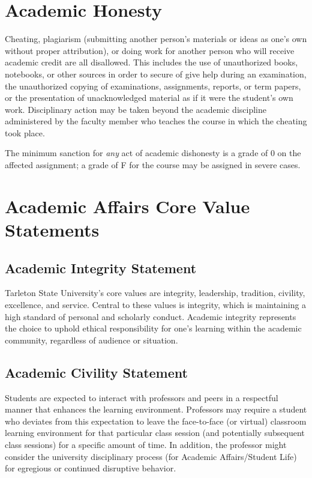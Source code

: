 \documentclass[10pt]{article}
\begin{document}
\section*{Academic Honesty}
\label{sec:org668621b}

Cheating, plagiarism (submitting another person’s materials or ideas as one’s own without proper attribution), or doing work for another person who will receive academic credit are all disallowed. This includes the use of unauthorized books, notebooks, or other sources in order to secure of give help during an examination, the unauthorized copying of examinations, assignments, reports, or term papers, or the presentation of unacknowledged material as if it were the student’s own work. Disciplinary action may be taken beyond the academic discipline administered by the faculty member who teaches the course in which the cheating took place.

The minimum sanction for \emph{any} act of academic dishonesty is a grade of 0 on the affected assignment; a grade of F for the course may be assigned in severe cases.

\section*{Academic Affairs Core Value Statements}
\label{sec:orge1ce77e}

\subsection*{Academic Integrity Statement}
\label{sec:org0e55dde}
Tarleton State University's core values are integrity, leadership, tradition, civility, excellence, and service.  Central to these values is integrity, which is maintaining a high standard of personal and scholarly conduct.  Academic integrity represents the choice to uphold ethical responsibility for one’s learning within the academic community, regardless of audience or situation.

\subsection*{Academic Civility Statement}
\label{sec:orgd6b6280}
Students are expected to interact with professors and peers in a respectful manner that enhances the learning environment. Professors may require a student who deviates from this expectation to leave the face-to-face (or virtual) classroom learning environment for that particular class session (and potentially subsequent class sessions) for a specific amount of time. In addition, the professor might consider the university disciplinary process (for Academic Affairs/Student Life) for egregious or continued disruptive behavior.
\end{document}
